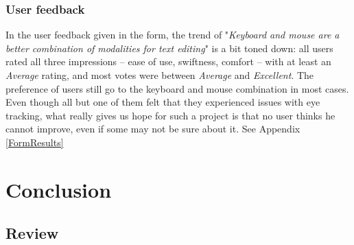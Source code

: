 \documentclass[12pt, a4paper]{article}
\begin{document}
\subsubsection{User feedback} \label{feedback}
In the user feedback given in the form, the trend of "\textit{Keyboard and mouse are a better combination of modalities for text editing}" is a bit toned down: all users rated all three impressions -- ease of use, swiftness, comfort -- with at least an \textit{Average} rating, and most votes were between \textit{Average} and \textit{Excellent}. The preference of users still go to the keyboard and mouse combination in most cases. \\
Even though all but one of them felt that they experienced issues with eye tracking, what really gives us hope for such a project is that no user thinks he cannot improve, even if some may not be sure about it. 
See Appendix \ref{FormResults}

\section{Conclusion}

\subsection{Review}
\end{document}
